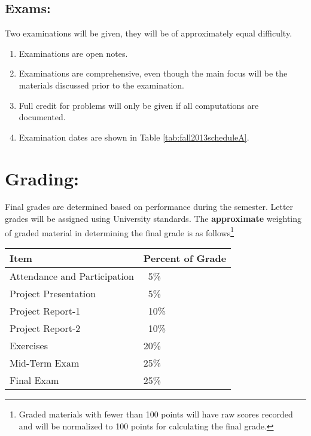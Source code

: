 \documentclass[12pt]{article}
\begin{document}
\subsection*{Exams:} Two examinations will be given, they will be of approximately equal difficulty.
\begin{enumerate}
\item Examinations are open notes.
\item Examinations are comprehensive, even though the main focus will be the materials discussed prior to the examination.
\item Full credit for problems will only be given if all computations are documented.
\item Examination dates are shown in Table \ref{tab:fall2013scheduleA}.
\end{enumerate}

\section*{Grading:} Final grades are determined based on performance during the semester.  Letter grades will be assigned using University standards.  The \textbf{approximate} weighting of graded material in determining the final grade is as follows\footnote{Graded materials with fewer than 100 points will have raw scores recorded and will be normalized to 100 points for calculating the final grade.}
\begin{table}[h!]
   \centering
   \begin{tabular}{l l}
Item & Percent of Grade \\
\hline
\hline
Attendance and Participation & ~5\% \\
Project Presentation & ~5\% \\
Project Report-1 & ~10\% \\
Project Report-2 & ~10\% \\
Exercises & 20\% \\
Mid-Term Exam & 25\% \\
Final Exam & 25\% \\
\hline
\end{tabular}
\end{table}

\clearpage
\end{document}
